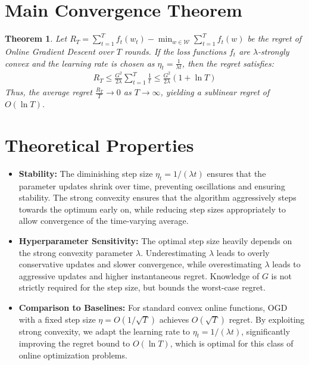 \documentclass{article}
\newtheorem{theorem}{Theorem}
\begin{document}
\section*{Main Convergence Theorem}
\begin{theorem}
Let $R_T = \sum_{t=1}^T f_t(w_t) - \min_{w \in \mathcal{W}} \sum_{t=1}^T f_t(w)$ be the regret of Online Gradient Descent over $T$ rounds. If the loss functions $f_t$ are $\lambda$-strongly convex and the learning rate is chosen as $\eta_t = \frac{1}{\lambda t}$, then the regret satisfies:
\begin{align*}
R_T \leq \frac{G^2}{2\lambda} \sum_{t=1}^T \frac{1}{t} \leq \frac{G^2}{2\lambda} (1 + \ln T)
\end{align*}
Thus, the average regret $\frac{R_T}{T} \to 0$ as $T \to \infty$, yielding a sublinear regret of $O(\ln T)$.
\end{theorem}

\section*{Theoretical Properties}
\begin{itemize}
\item \textbf{Stability:} The diminishing step size $\eta_t = 1/(\lambda t)$ ensures that the parameter updates shrink over time, preventing oscillations and ensuring stability. The strong convexity ensures that the algorithm aggressively steps towards the optimum early on, while reducing step sizes appropriately to allow convergence of the time-varying average.
\item \textbf{Hyperparameter Sensitivity:} The optimal step size heavily depends on the strong convexity parameter $\lambda$. Underestimating $\lambda$ leads to overly conservative updates and slower convergence, while overestimating $\lambda$ leads to aggressive updates and higher instantaneous regret. Knowledge of $G$ is not strictly required for the step size, but bounds the worst-case regret.
\item \textbf{Comparison to Baselines:} For standard convex online functions, OGD with a fixed step size $\eta = O(1/\sqrt{T})$ achieves $O(\sqrt{T})$ regret. By exploiting strong convexity, we adapt the learning rate to $\eta_t = 1/(\lambda t)$, significantly improving the regret bound to $O(\ln T)$, which is optimal for this class of online optimization problems.
\end{itemize}
\end{document}
